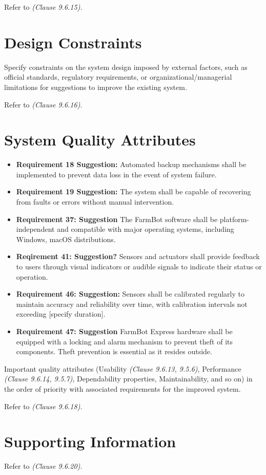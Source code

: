 Refer to \textit{(Clause 9.6.15)}.

\section{Design Constraints}

Specify constraints on the system design imposed by external factors, such as official standards, regulatory requirements, or organizational/managerial limitations for suggestions to improve the existing system.

Refer to \textit{(Clause 9.6.16)}.

\section{System Quality Attributes}
\begin{itemize}
	\item \textbf{Requirement 18 Suggestion:} Automated backup mechanisms shall be implemented to prevent data loss in the event of system failure.
	\item \textbf {Requirement 19 Suggestion:} The system shall be capable of recovering from faults or errors without manual intervention.
	\item \textbf{Requirement 37: Suggestion} The FarmBot software shall be platform-independent and compatible with major operating systems, including Windows, macOS distributions.
	\item \textbf{Reqirement 41: Suggestion?} Sensors and actuators shall provide feedback to users through visual indicators or audible signals to indicate their status or operation. 
	\item \textbf {Requirement 46: Suggestion:} Sensors shall be calibrated regularly to maintain accuracy and reliability over time, with calibration intervals not exceeding [specify duration].
	\item \textbf{Requirement 47: Suggestion} FarmBot Express hardware shall be equipped with a locking and alarm mechanism to prevent theft of its components.  Theft prevention is essential as it resides outside.
\end{itemize}

Important quality attributes (Usability \textit{(Clause 9.6.13, 9.5.6)}, Performance \textit{(Clause 9.6.14, 9.5.7)}, Dependability properties, Maintainability, and so on) in the order of priority with associated requirements for the improved system.

Refer to \textit{(Clause 9.6.18)}.

\section{Supporting Information}

Refer to \textit{(Clause 9.6.20)}.